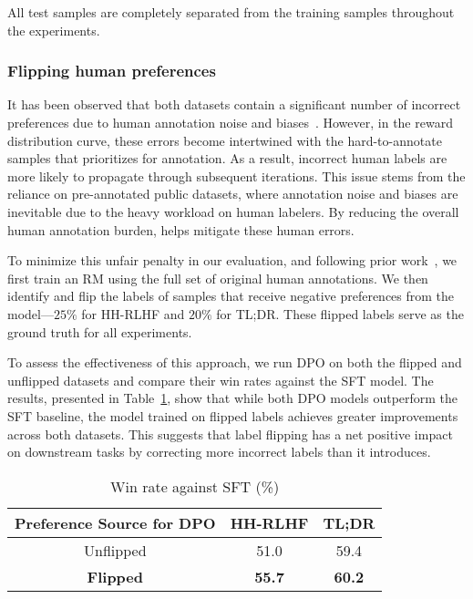 All test samples are completely separated from the training samples throughout the experiments.

\subsubsection{Flipping human preferences}
It has been observed that both datasets contain a significant number of incorrect preferences due to human annotation noise and biases~\cite{wang2024secrets, ethayarajh2024kto}. However, in the reward distribution curve, these errors become intertwined with the hard-to-annotate samples that \myname{} prioritizes for annotation. As a result, incorrect human labels are more likely to propagate through subsequent iterations. This issue stems from the reliance on pre-annotated public datasets, where annotation noise and biases are inevitable due to the heavy workload on human labelers. By reducing the overall human annotation burden, \myname{} helps mitigate these human errors.

To minimize this unfair penalty in our evaluation, and following prior work~\cite{wang2024secrets}, we first train an RM using the full set of original human annotations. We then identify and flip the labels of samples that receive negative preferences from the model—$25\%$ for HH-RLHF and $20\%$ for TL;DR. These flipped labels serve as the ground truth for all experiments.

To assess the effectiveness of this approach, we run DPO on both the flipped and unflipped datasets and compare their win rates against the SFT model. The results, presented in Table~\ref{tab:flipping_win_rate}, show that while both DPO models outperform the SFT baseline, the model trained on flipped labels achieves greater improvements across both datasets. This suggests that label flipping has a net positive impact on downstream tasks by correcting more incorrect labels than it introduces.

\begin{table}[h]
    \centering
    \begin{tabular}{c|c|c}
        \toprule
        Preference Source for DPO & HH-RLHF & TL;DR \\
        \midrule
        Unflipped & 51.0 & 59.4\\
        \textbf{Flipped} & \textbf{55.7} & \textbf{60.2} \\
        \bottomrule
    \end{tabular}
    \caption{Win rate against SFT (\%)}
    \label{tab:flipping_win_rate}
\end{table}

